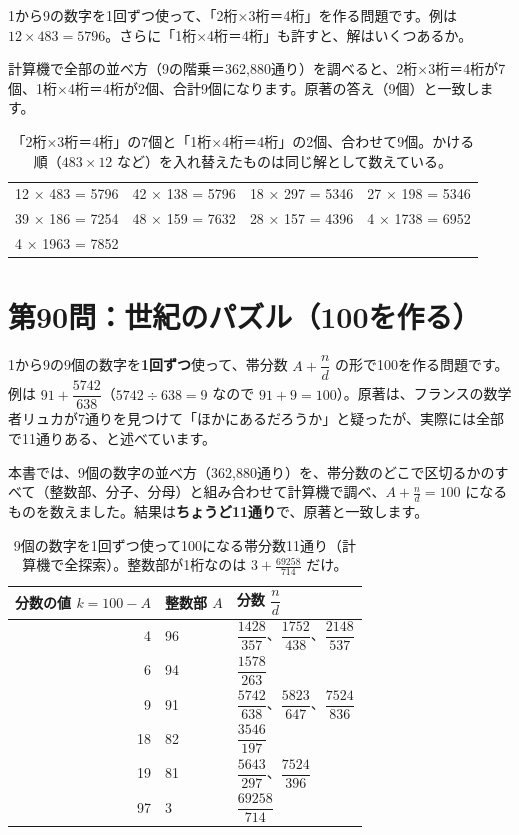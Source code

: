 \documentclass[a4paper,11pt,openany]{ltjsbook}
\begin{document}
1から9の数字を1回ずつ使って、「2桁×3桁＝4桁」を作る問題です。例は $12\times483=5796$。さらに「1桁×4桁＝4桁」も許すと、解はいくつあるか。

計算機で全部の並べ方（9の階乗＝362,880通り）を調べると、2桁×3桁＝4桁が7個、1桁×4桁＝4桁が2個、合計9個になります。原著の答え（9個）と一致します。

\begin{table}[htbp]
\centering
\begin{tabular}{llll}
\toprule
12 × 483 = 5796 & 42 × 138 = 5796 & 18 × 297 = 5346 & 27 × 198 = 5346\\
39 × 186 = 7254 & 48 × 159 = 7632 & 28 × 157 = 4396 & 4 × 1738 = 6952\\
4 × 1963 = 7852 & & &\\
\bottomrule
\end{tabular}
\caption{「2桁×3桁＝4桁」の7個と「1桁×4桁＝4桁」の2個、合わせて9個。かける順（$483\times12$ など）を入れ替えたものは同じ解として数えている。}
\end{table}

\section{第90問：世紀のパズル（100を作る）}

1から9の9個の数字を\textbf{1回ずつ}使って、帯分数 $A+\dfrac{n}{d}$ の形で100を作る問題です。例は $91+\dfrac{5742}{638}$（$5742\div638=9$ なので $91+9=100$）。原著は、フランスの数学者リュカが7通りを見つけて「ほかにあるだろうか」と疑ったが、実際には全部で11通りある、と述べています。

本書では、9個の数字の並べ方（362,880通り）を、帯分数のどこで区切るかのすべて（整数部、分子、分母）と組み合わせて計算機で調べ、$A+\tfrac nd=100$ になるものを数えました。結果は\textbf{ちょうど11通り}で、原著と一致します。

\begin{table}[htbp]
\centering
\small
\begin{tabular}{rll}
\toprule
分数の値 $k=100-A$ & 整数部 $A$ & 分数 $\dfrac{n}{d}$\\
\midrule
4 & 96 & $\dfrac{1428}{357}$、$\dfrac{1752}{438}$、$\dfrac{2148}{537}$\\[2mm]
6 & 94 & $\dfrac{1578}{263}$\\[2mm]
9 & 91 & $\dfrac{5742}{638}$、$\dfrac{5823}{647}$、$\dfrac{7524}{836}$\\[2mm]
18 & 82 & $\dfrac{3546}{197}$\\[2mm]
19 & 81 & $\dfrac{5643}{297}$、$\dfrac{7524}{396}$\\[2mm]
97 & 3 & $\dfrac{69258}{714}$\\
\bottomrule
\end{tabular}
\caption{9個の数字を1回ずつ使って100になる帯分数11通り（計算機で全探索）。整数部が1桁なのは $3+\tfrac{69258}{714}$ だけ。}
\end{table}
\end{document}
